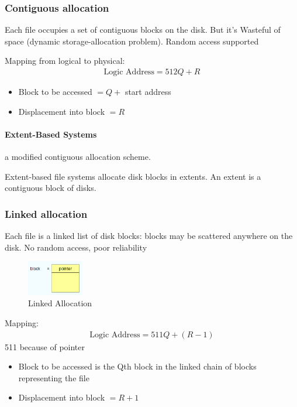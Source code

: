 \subsubsection{Contiguous allocation}
Each file occupies a set of contiguous blocks on the disk. But it's Wasteful of space (dynamic storage-allocation problem). Random access supported

Mapping from logical to physical: 
\begin{align*}
    \text{Logic Address}=512Q+R
\end{align*}
\begin{itemize}
    \item Block to be accessed $=Q+$ start address
    \item Displacement into block $=R$
\end{itemize}

\paragraph*{Extent-Based Systems} a modified contiguous allocation scheme. 

Extent-based file systems allocate disk blocks in extents.  An extent is a contiguous block of disks. 

\subsubsection{Linked allocation}
Each file is a linked list of disk blocks: blocks may be scattered anywhere on the disk. No random access, poor reliability

\begin{figure}[!htb]
    \centering
    \includegraphics[width=0.22\textwidth]{pic/OS11/Linked Allocation}
    \caption{Linked Allocation}
\end{figure}

Mapping: 
\begin{align*}
    \text{Logic Address}=511Q+(R-1)
\end{align*}
511 because of pointer
\begin{itemize}
    \item Block to be accessed is the Qth block in the linked chain of
    blocks representing the file
    \item Displacement into block $=R+1$
\end{itemize}

